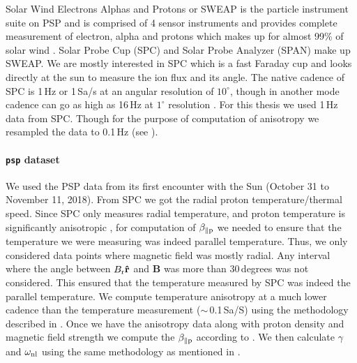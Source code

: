                 Solar Wind Electrons Alphas and Protons or SWEAP is the particle instrument suite on
                PSP and is comprised of 4 sensor instruments and provides complete measurement of
                electron, alpha and protons which makes up for almost 99\% of solar wind
                \citep{Kasper2016}. Solar Probe Cup (SPC) and Solar Probe Analyzer (SPAN) make up
                SWEAP. We are mostly interested in SPC which is a fast Faraday cup and looks
                directly at the sun to measure the ion flux and its angle. The native cadence of SPC
                is 1\,Hz or 1\,Sa/s at an angular resolution of $\mathrm{10}^\circ$, though in
                another mode cadence can go as high as 16\,Hz at $\mathrm{1}^\circ$ resolution
                \citep{Kasper2016}. For this thesis we used 1\,Hz data from SPC. Though for the
                purpose of computation of anisotropy we resampled the data to 0.1\,Hz (see
                ).

            \paragraph*{\texttt{psp} dataset} \label{sec:pspds}

                We used the PSP data from its first encounter with the Sun (October 31 to November
                11, 2018). From SPC we got the radial proton temperature/thermal speed. Since SPC
                only measures radial temperature, and proton temperature is significantly
                anisotropic \citep{Huang2020}, for computation of $\beta_{\parallel \rm p}$ we
                needed to ensure that the temperature we were measuring was indeed parallel
                temperature. Thus, we only considered data points where magnetic field was mostly
                radial. Any interval where the angle between $B_{\rm r} \mathbf{\hat{r}}$ and
                $\mathbf{B}$ was more than 30\,degrees was not considered. This ensured that the
                temperature measured by SPC was indeed the parallel temperature. We compute
                temperature anisotropy at a much lower cadence than the temperature measurement
                ($\sim$\,0.1\,Sa/S) using the methodology described in \citet{Huang2020}. Once we
                have the anisotropy data along with proton density and magnetic field strength we
                compute the $\beta_{\parallel \rm p}$ according to . We then calculate
                $\gamma$ and $\omega_{\rm {nl}}$ using the same methodology as mentioned in
                . 

